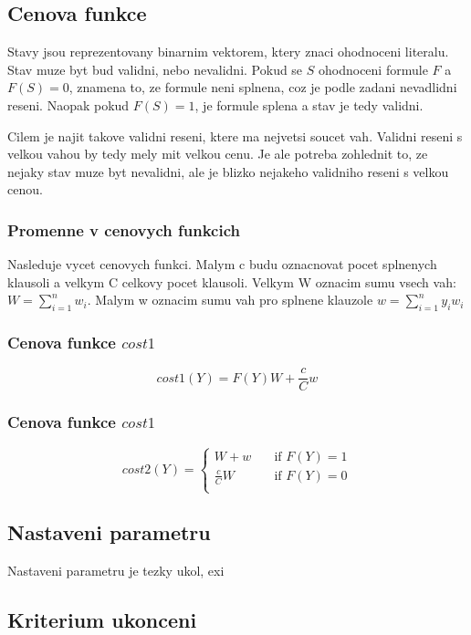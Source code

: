 \documentclass[12pt,a4paper]{article}
\begin{document}
\subsection{Cenova funkce}

Stavy jsou reprezentovany binarnim vektorem, ktery znaci ohodnoceni literalu. Stav muze byt bud validni, nebo nevalidni. Pokud se $S$ ohodnoceni formule $F$ a $F(S) = 0$, znamena to, ze formule neni splnena, coz je podle zadani nevadlidni reseni. Naopak pokud $F(S) = 1$, je formule splena a stav je tedy validni.

Cilem je najit takove validni reseni, ktere ma nejvetsi soucet vah. Validni reseni s velkou vahou by tedy mely mit velkou cenu. Je ale potreba zohlednit to, ze nejaky stav muze byt nevalidni, ale je blizko nejakeho validniho reseni s velkou cenou.

\subsubsection{Promenne v cenovych funkcich}

Nasleduje vycet cenovych funkci. Malym c budu oznacnovat pocet splnenych klausoli a velkym C celkovy pocet klausoli. Velkym W oznacim sumu vsech vah: $W = \sum_{i=1}^{n}{w_i}$. Malym w oznacim sumu vah pro splnene klauzole $w = \sum_{i=1}^{n}{y_i w_i}$

\subsubsection{Cenova funkce $cost1$}

$$ cost1(Y) = F(Y)W + \frac{c}{C}w $$


\subsubsection{Cenova funkce $cost1$}

$$
 cost2(Y) =
  \begin{cases}
    W + w       & \quad \text{if } F(Y) = 1 \\
    \frac{c}{C}W  & \quad \text{if } F(Y) = 0 \\
  \end{cases}
$$


\subsection{Nastaveni parametru}
Nastaveni parametru je tezky ukol, exi

\subsection{Kriterium ukonceni}
\end{document}
